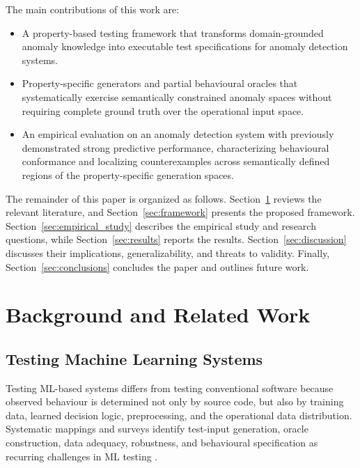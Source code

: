 \documentclass[preprint,12pt]{elsarticle}
\begin{document}
The main contributions of this work are:
\begin{itemize}

    \item A property-based testing framework that transforms domain-grounded
    anomaly knowledge into executable test specifications for anomaly
    detection systems.

    \item Property-specific generators and partial behavioural oracles that
    systematically exercise semantically constrained anomaly spaces without
    requiring complete ground truth over the operational input space.

    \item An empirical evaluation on an anomaly detection system with
    previously demonstrated strong predictive performance, characterizing
    behavioural conformance and localizing counterexamples across semantically
    defined regions of the property-specific generation spaces.

\end{itemize}

The remainder of this paper is organized as follows.
Section~\ref{sec:related_work} reviews the relevant literature, and
Section~\ref{sec:framework} presents the proposed framework.
Section~\ref{sec:empirical_study} describes the empirical study and research
questions, while Section~\ref{sec:results} reports the results.
Section~\ref{sec:discussion} discusses their implications, generalizability,
and threats to validity. Finally, Section~\ref{sec:conclusions} concludes the
paper and outlines future work.


\section{Background and Related Work}
\label{sec:related_work}

\subsection{Testing Machine Learning Systems}

Testing ML-based systems differs from testing conventional software because
observed behaviour is determined not only by source code, but also by training
data, learned decision logic, preprocessing, and the operational data
distribution. Systematic mappings and surveys identify test-input generation,
oracle construction, data adequacy, robustness, and behavioural specification
as recurring challenges in ML testing
\cite{riccio2020testing,zhang2022mltesting,benbraiek2020testingml}.
\end{document}
